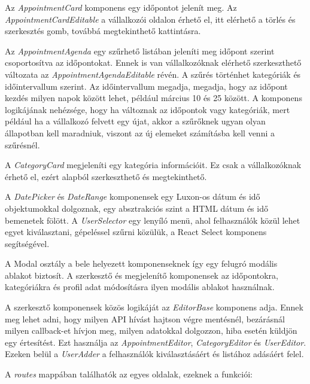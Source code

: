 Az \textit{AppointmentCard} komponens egy időpontot jelenít meg. Az \textit{AppointmentCardEditable} a vállalkozói oldalon érhető el, itt elérhető a törlés és szerkesztés gomb, továbbá megtekinthető kattintásra.

Az \textit{AppointmentAgenda} egy szűrhető listában jeleníti meg időpont szerint csoportosítva az időpontokat. Ennek is van vállalkozóknak elérhető szerkeszthető változata az \textit{AppointmentAgendaEditable} révén. A szűrés történhet kategóriák és időintervallum szerint. Az időintervallum megadja, megadja, hogy az időpont kezdés milyen napok között lehet, például március 10 és 25 között. A komponens logikájának nehézsége, hogy ha változnak az időpontok vagy kategóriák, mert például ha a vállalkozó felvett egy újat, akkor a szűrőknek ugyan olyan állapotban kell maradniuk, viszont az új elemeket számításba kell venni a szűrésnél.

A \textit{CategoryCard} megjeleníti egy kategória információit. Ez csak a vállalkozóknak érhető el, ezért alapból szerkeszthető és megtekinthető.

A \textit{DatePicker} és \textit{DateRange} komponensek egy Luxon-os dátum és idő objektumokkal dolgoznak, egy absztrakciós szint a HTML dátum és idő bemenetek fölött. A \textit{UserSelector} egy lenyíló menü, ahol felhasználók közül lehet egyet kiválasztani, gépeléssel szűrni közülük, a React Select komponens segítségével.

A Modal osztály a bele helyezett komponenseknek így egy felugró modális ablakot biztosít. A szerkesztő és megjelenítő komponensek az időpontokra, kategóriákra és profil adat módosításra ilyen modális ablakot használnak.

A szerkesztő komponensek közös logikáját az \textit{EditorBase} komponens adja. Ennek meg lehet adni, hogy milyen API hívást hajtson végre mentésnél, bezárásnál milyen callback-et hívjon meg, milyen adatokkal dolgozzon, hiba esetén küldjön egy értesítést. Ezt használja az \textit{AppointmentEditor}, \textit{CategoryEditor} és \textit{UserEditor}. Ezeken belül a \textit{UserAdder} a felhasználók kiválasztásáért és listához adásáért felel.

A \textit{routes} mappában találhatók az egyes oldalak, ezeknek a funkciói:

